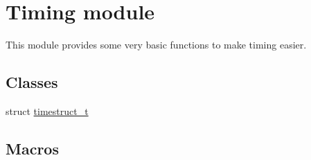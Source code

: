 \hypertarget{group__timing}{\section{Timing module}
\label{group__timing}
}


This module provides some very basic functions to make timing easier.  


\subsection*{Classes}
\begin{DoxyCompactItemize}
\item 
struct \hyperlink{structtimestruct__t}{timestruct\+\_\+t}
\end{DoxyCompactItemize}
\subsection*{Macros}
